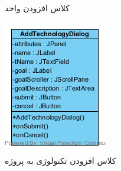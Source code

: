 \begin{figure}[H]
\begin{subfigure}[b]{0.2\textwidth}
		\caption{کلاس افزودن واحد }
	\end{subfigure}
	\begin{subfigure}[b]{0.2\textwidth}
		\includegraphics[width=\textwidth]{img/class-design/ui/AddTechnologyDialog.png}
		\caption{کلاس افزودن تکنولوژی به پروژه}
	\end{subfigure}
	\begin{subfigure}[b]{0.2\textwidth}

\end{subfigure}
\end{figure}

